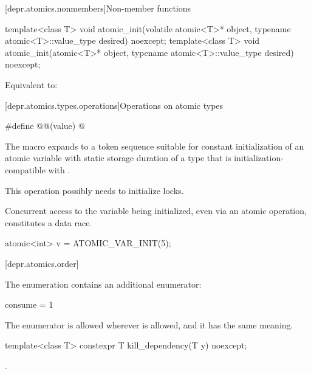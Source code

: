 [depr.atomics.nonmembers]{Non-member functions}

%
\begin{itemdecl}
template<class T>
  void atomic_init(volatile atomic<T>* object, typename atomic<T>::value_type desired) noexcept;
template<class T>
  void atomic_init(atomic<T>* object, typename atomic<T>::value_type desired) noexcept;
\end{itemdecl}

\begin{itemdescr}
\pnum
\effects
Equivalent to: 
\end{itemdescr}

[depr.atomics.types.operations]{Operations on atomic types}

%
\begin{itemdecl}
#define @@(value) @\seebelow@
\end{itemdecl}

\begin{itemdescr}
\pnum
The macro expands to a token sequence suitable for constant initialization of
an atomic variable with static storage duration of a type that
is initialization-compatible with .
\begin{note}
This operation possibly needs to initialize locks.
\end{note}
Concurrent access to the variable being initialized,
even via an atomic operation,
constitutes a data race.
\begin{example}
\begin{codeblock}
atomic<int> v = ATOMIC_VAR_INIT(5);
\end{codeblock}
\end{example}
\end{itemdescr}

[depr.atomics.order]{}

%
%
\pnum
The  enumeration contains an additional enumerator:
\begin{codeblock}
consume = 1
\end{codeblock}
The  enumerator is allowed wherever
 is allowed, and it has the same meaning.

\begin{itemdecl}
template<class T> constexpr T kill_dependency(T y) noexcept;
\end{itemdecl}

\begin{itemdescr}
\pnum
\returns
{}.
\end{itemdescr}
